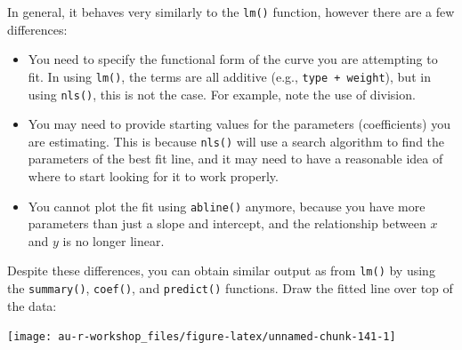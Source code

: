 \documentclass[]{book}
\newenvironment{Shaded}{\begin{snugshade}}{\end{snugshade}}
\newcommand{\KeywordTok}[1]{\textcolor[rgb]{0.13,0.29,0.53}{\textbf{#1}}}
\newcommand{\DataTypeTok}[1]{\textcolor[rgb]{0.13,0.29,0.53}{#1}}
\newcommand{\DecValTok}[1]{\textcolor[rgb]{0.00,0.00,0.81}{#1}}
\newcommand{\FloatTok}[1]{\textcolor[rgb]{0.00,0.00,0.81}{#1}}
\newcommand{\StringTok}[1]{\textcolor[rgb]{0.31,0.60,0.02}{#1}}
\newcommand{\OperatorTok}[1]{\textcolor[rgb]{0.81,0.36,0.00}{\textbf{#1}}}
\newcommand{\NormalTok}[1]{#1}
\providecommand{\tightlist}{%
  \setlength{\itemsep}{0pt}\setlength{\parskip}{0pt}}
\theoremstyle{definition}
\theoremstyle{definition}
\theoremstyle{definition}
\theoremstyle{remark}
\begin{document}
In general, it behaves very similarly to the \texttt{lm()} function,
however there are a few differences:

\begin{itemize}
\tightlist
\item
  You need to specify the functional form of the curve you are
  attempting to fit. In using \texttt{lm()}, the terms are all additive
  (e.g., \texttt{type\ +\ weight}), but in using \texttt{nls()}, this is
  not the case. For example, note the use of division.
\item
  You may need to provide starting values for the parameters
  (coefficients) you are estimating. This is because \texttt{nls()} will
  use a search algorithm to find the parameters of the best fit line,
  and it may need to have a reasonable idea of where to start looking
  for it to work properly.
\item
  You cannot plot the fit using \texttt{abline()} anymore, because you
  have more parameters than just a slope and intercept, and the
  relationship between \(x\) and \(y\) is no longer linear.
\end{itemize}

Despite these differences, you can obtain similar output as from
\texttt{lm()} by using the \texttt{summary()}, \texttt{coef()}, and
\texttt{predict()} functions. Draw the fitted line over top of the data:

\begin{Shaded}
\end{Shaded}

\begin{center}\texttt{[image: au-r-workshop\_files/figure-latex/unnamed-chunk-141-1]} \end{center}
\end{document}
